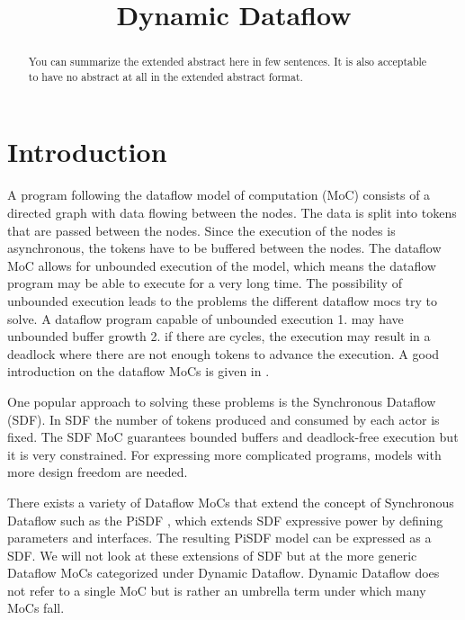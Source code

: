 \documentclass[conference,a4paper]{IEEEtran}
\begin{document}
%
\title{Dynamic Dataflow}

\author{
}

\maketitle

\begin{abstract}
You can summarize the extended abstract here in few sentences. It is
also acceptable to have no abstract at all in the extended abstract
format.
\end{abstract}

\section{Introduction}
A program following the dataflow model of computation (MoC) consists of a
directed graph with data flowing between the nodes. The data is split into
tokens that are passed between the nodes. Since the execution of the nodes is
asynchronous, the tokens have to be buffered between the nodes. The dataflow MoC
allows for unbounded execution of the model, which means the dataflow program
may be able to execute for a very long time. The possibility of unbounded
execution leads to the problems the different dataflow mocs try to solve. A
dataflow program capable of unbounded execution 1. may have unbounded buffer
growth 2. if there are cycles, the execution may result in a deadlock where
there are not enough tokens to advance the execution. A good introduction on the
dataflow MoCs is given in \cite{lee2015introduction}.

One popular approach to solving these problems is the Synchronous Dataflow
(SDF). In SDF the number of tokens produced and consumed by each actor is fixed.
The SDF MoC guarantees bounded buffers and deadlock-free execution but it is
very constrained. For expressing more complicated programs, models with more
design freedom are needed. \cite{lee2015introduction}

There exists a variety of Dataflow MoCs that extend the concept of Synchronous
Dataflow such as the PiSDF \cite{desnos2013pimm}, which extends SDF expressive
power by defining parameters and interfaces. The resulting PiSDF model can be
expressed as a SDF. We will not look at these extensions of SDF but at the more
generic Dataflow MoCs categorized under Dynamic Dataflow. Dynamic Dataflow does
not refer to a single MoC but is rather an umbrella term under which many MoCs
fall.
\end{document}

